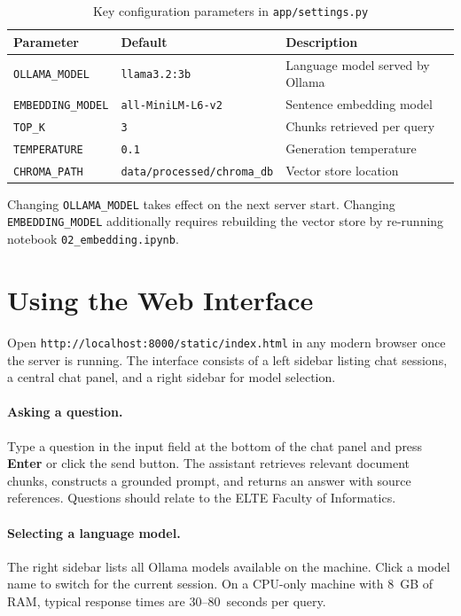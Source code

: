 \begin{table}[h]
\centering
\begin{tabular}{lll}
\hline
\textbf{Parameter} & \textbf{Default} & \textbf{Description} \\
\hline
\texttt{OLLAMA\_MODEL}    & \texttt{llama3.2:3b}      & Language model served by Ollama \\
\texttt{EMBEDDING\_MODEL} & \texttt{all-MiniLM-L6-v2} & Sentence embedding model \\
\texttt{TOP\_K}           & \texttt{3}                & Chunks retrieved per query \\
\texttt{TEMPERATURE}      & \texttt{0.1}              & Generation temperature \\
\texttt{CHROMA\_PATH}     & \texttt{data/processed/chroma\_db} & Vector store location \\
\hline
\end{tabular}
\caption{Key configuration parameters in \texttt{app/settings.py}}
\label{tab:user-settings}
\end{table}

Changing \texttt{OLLAMA\_MODEL} takes effect on the next server start.
Changing \texttt{EMBEDDING\_MODEL} additionally requires rebuilding the vector
store by re-running notebook \texttt{02\_embedding.ipynb}.

\section{Using the Web Interface}
\label{sec:user-web}

Open \texttt{http://localhost:8000/static/index.html} in any modern browser once
the server is running. The interface consists of a left sidebar listing chat
sessions, a central chat panel, and a right sidebar for model selection.

\paragraph{Asking a question.}
Type a question in the input field at the bottom of the chat panel and press
\textbf{Enter} or click the send button. The assistant retrieves relevant document
chunks, constructs a grounded prompt, and returns an answer with source references.
Questions should relate to the ELTE Faculty of Informatics.

\paragraph{Selecting a language model.}
The right sidebar lists all Ollama models available on the machine. Click a model
name to switch for the current session. On a CPU-only machine with 8~GB of RAM,
typical response times are 30--80~seconds per query.

